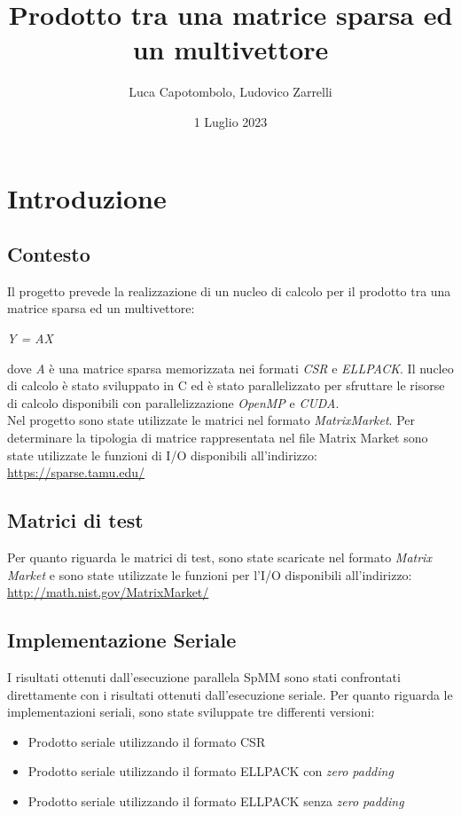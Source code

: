 \documentclass{article}
\title{Prodotto tra una matrice sparsa ed un multivettore}
\author{Luca Capotombolo, Ludovico Zarrelli}
\date{1 Luglio 2023}
\begin{document}
\maketitle

\tableofcontents

\clearpage

\section{Introduzione}

\subsection{Contesto}
Il progetto prevede la realizzazione di un nucleo di calcolo per il prodotto tra una matrice sparsa ed un multivettore:
\begin{center}
\textit{Y = AX}
\end{center}
dove \textit{A} è una matrice sparsa memorizzata nei formati \textit{CSR} e \textit{ELLPACK}. Il nucleo di calcolo è stato sviluppato in C ed è stato parallelizzato per sfruttare le risorse di calcolo disponibili con parallelizzazione \textit{OpenMP} e \textit{CUDA}. \\

Nel progetto sono state utilizzate le matrici nel formato \textit{MatrixMarket}. Per determinare la tipologia di matrice rappresentata nel file Matrix Market sono state utilizzate le funzioni di I/O disponibili all'indirizzo:
\url{https://sparse.tamu.edu/}

\subsection{Matrici di test}
Per quanto riguarda le matrici di test, sono state scaricate nel formato \textit{Matrix Market} e sono state utilizzate le funzioni per l'I/O disponibili all'indirizzo: \url{http://math.nist.gov/MatrixMarket/}

\subsection{Implementazione Seriale}
I risultati ottenuti dall'esecuzione parallela SpMM sono stati confrontati direttamente con i risultati ottenuti dall'esecuzione seriale. Per quanto riguarda le implementazioni seriali, sono state sviluppate tre differenti versioni:

\begin{itemize}
\item Prodotto seriale utilizzando il formato CSR
\item Prodotto seriale utilizzando il formato ELLPACK con \textit{zero padding}
\item Prodotto seriale utilizzando il formato ELLPACK senza \textit{zero padding}
\end{itemize}
\end{document}
